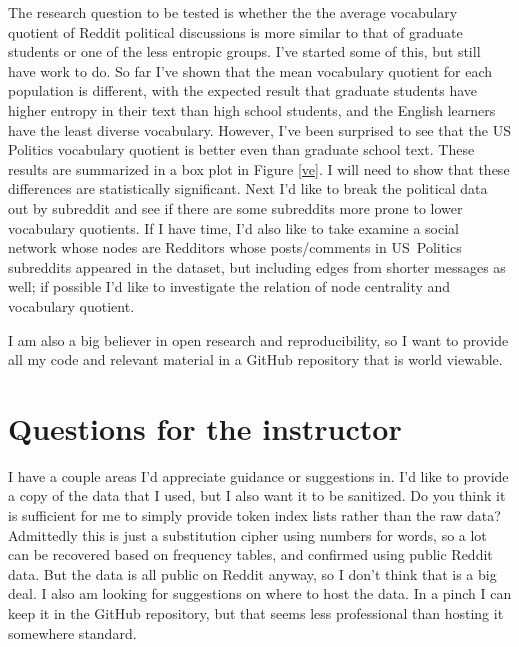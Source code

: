 \documentclass{amsart}
\theoremstyle{definition}
\theoremstyle{plain}
\numberwithin{equation}{section}
\begin{document}
The research question to be tested is whether the the average vocabulary
quotient of Reddit political discussions is more similar to that of graduate
students or one of the less entropic groups. I've started some of this, but
still have work to do. So far I've shown that the mean vocabulary quotient
for each population is different, with the expected result that graduate
students have higher entropy in their text than high school students, and
the English learners have the least diverse vocabulary. However, I've been
surprised to see that the US Politics vocabulary quotient is better even
than graduate school text. These results are summarized in a box plot in
Figure \ref{ve}. I will need to show that these differences are
statistically significant. Next I'd like to break the political data out by
subreddit and see if there are some subreddits more prone to lower
vocabulary quotients. If I have time, I'd also like to take examine a social
network whose nodes are Redditors whose posts/comments in US\ Politics
subreddits appeared in the dataset, but including edges from shorter
messages as well; if possible I'd like to investigate the relation of node
centrality and vocabulary quotient.   

I am also a big believer in open research and reproducibility, so I want to
provide all my code and relevant material in a GitHub repository that is
world viewable. 

\section{Questions for the instructor}

I have a couple areas I'd appreciate guidance or suggestions in. I'd like to
provide a copy of the data that I used, but I also want it to be sanitized.
Do you think it is sufficient for me to simply provide token index lists
rather than the raw data? Admittedly this is just a substitution cipher
using numbers for words, so a lot can be recovered based on frequency
tables, and confirmed using public Reddit data. But the data is all public
on Reddit anyway, so I don't think that is a big deal. I also am looking for
suggestions on where to host the data. In a pinch I can keep it in the
GitHub repository, but that seems less professional than hosting it
somewhere standard.



\end{document}

